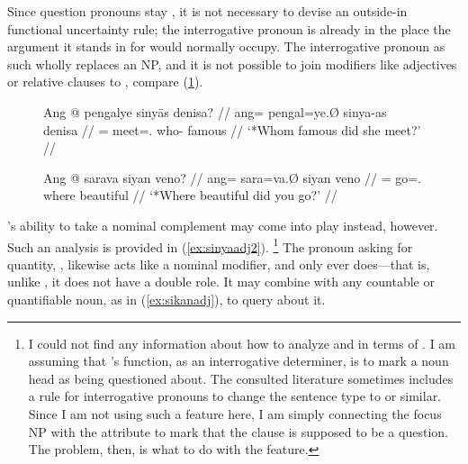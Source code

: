 Since question pronouns stay , it is not necessary to devise an
outside-in functional uncertainty rule; the interrogative pronoun is already in
the place the argument it stands in for would normally occupy. The
interrogative pronoun as such wholly replaces an NP, and it is not possible to
join modifiers like adjectives or relative clauses to , compare 
(\ref{ex:itradj}).

\begin{figure}
\pex\label{ex:itradj}
\a\ljudge*\begingl
	\gla Ang @ pengalye sinyās denisa? //
	\glb ang= pengal=ye.Ø sinya-as denisa //
	\glc \AgtT{}= meet=\TsgF{}.\Top{} who-\Parg{} famous //
	\glft `*Whom famous did she meet?' //
\endgl

\a\ljudge*\begingl
	\gla Ang @ sarava siyan veno? //
	\glb ang= sara=va.Ø siyan veno //
	\glc \Aarg{}= go=\Second{}.\Top{} where beautiful //
	\glft `*Where beautiful did you go?' //
\endgl
\xe
\end{figure}

's ability to take a nominal complement may come into play
instead, however. Such an analysis is provided in (\ref{ex:sinyaadj2}).%
\footnote{I could not find any information about how to
analyze  and  in terms of \Lfg{}. I am assuming that 's function, as an interrogative
determiner, is to mark a noun head as being questioned about. The consulted
literature sometimes includes a rule for interrogative
pronouns to change the sentence type to
 or similar. Since I am not using such a feature here, I am
simply connecting the focus NP with the \Q{} attribute to mark that the clause is supposed
to be a question. The problem, then, is what to do with the \Prontype{}
feature.} The pronoun asking for
quantity, , likewise acts like a nominal
modifier, and only ever does---that is, unlike , it does not
have a double role. It may combine with any countable or quantifiable noun, as
in (\ref{ex:sikanadj}), to query about it.

